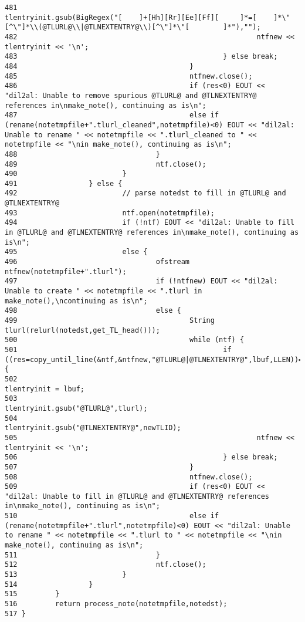 \begin{verbatim}
481                                                         tlentryinit.gsub(BigRegex("[    ]+[Hh][Rr][Ee][Ff][     ]*=[    ]*\"[^\"]*\\(@TLURL@\\|@TLNEXTENTRY@\\)[^\"]*\"[        ]*"),"");
482                                                         ntfnew << tlentryinit << '\n';
483                                                 } else break;
484                                         }
485                                         ntfnew.close();
486                                         if (res<0) EOUT << "dil2al: Unable to remove spurious @TLURL@ and @TLNEXTENTRY@ references in\nmake_note(), continuing as is\n";
487                                         else if (rename(notetmpfile+".tlurl_cleaned",notetmpfile)<0) EOUT << "dil2al: Unable to rename " << notetmpfile << ".tlurl_cleaned to " << notetmpfile << "\nin make_note(), continuing as is\n";
488                                 }
489                                 ntf.close();
490                         }
491                 } else {
492                         // parse notedst to fill in @TLURL@ and @TLNEXTENTRY@
493                         ntf.open(notetmpfile);
494                         if (!ntf) EOUT << "dil2al: Unable to fill in @TLURL@ and @TLNEXTENTRY@ references in\nmake_note(), continuing as is\n";
495                         else {
496                                 ofstream ntfnew(notetmpfile+".tlurl");
497                                 if (!ntfnew) EOUT << "dil2al: Unable to create " << notetmpfile << ".tlurl in make_note(),\ncontinuing as is\n";
498                                 else {
499                                         String tlurl(relurl(notedst,get_TL_head()));
500                                         while (ntf) {
501                                                 if ((res=copy_until_line(&ntf,&ntfnew,"@TLURL@|@TLNEXTENTRY@",lbuf,LLEN))==1) {
502                                                         tlentryinit = lbuf;
503                                                         tlentryinit.gsub("@TLURL@",tlurl);
504                                                         tlentryinit.gsub("@TLNEXTENTRY@",newTLID);
505                                                         ntfnew << tlentryinit << '\n';
506                                                 } else break;
507                                         }
508                                         ntfnew.close();
509                                         if (res<0) EOUT << "dil2al: Unable to fill in @TLURL@ and @TLNEXTENTRY@ references in\nmake_note(), continuing as is\n";
510                                         else if (rename(notetmpfile+".tlurl",notetmpfile)<0) EOUT << "dil2al: Unable to rename " << notetmpfile << ".tlurl to " << notetmpfile << "\nin make_note(), continuing as is\n";
511                                 }
512                                 ntf.close();
513                         }
514                 }
515         }
516         return process_note(notetmpfile,notedst);
517 }
\end{verbatim}\normalsize 
{}
